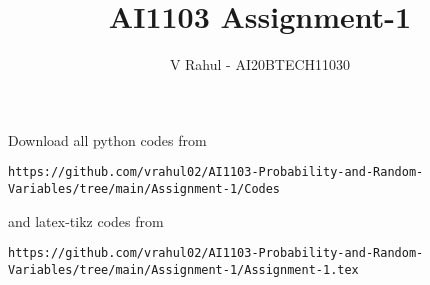 \documentclass[journal,12pt,twocolumn]{IEEEtran}
\DeclareMathOperator*{\Res}{Res}
\begin{document}
\newcommand{\BEQA}{\begin{eqnarray}}
\newcommand{\EEQA}{\end{eqnarray}}
\newcommand{\define}{\stackrel{\triangle}{=}}

\raggedbottom
\setlength{\parindent}{0pt}
\providecommand{\mbf}{\mathbf}
\providecommand{\pr}[1]{\ensuremath{\Pr\left(#1\right)}}
\providecommand{\qfunc}[1]{\ensuremath{Q\left(#1\right)}}
\providecommand{\sbrak}[1]{\ensuremath{{}\left[#1\right]}}
\providecommand{\lsbrak}[1]{\ensuremath{{}\left[#1\right.}}
\providecommand{\rsbrak}[1]{\ensuremath{{}\left.#1\right]}}
\providecommand{\brak}[1]{\ensuremath{\left(#1\right)}}
\providecommand{\lbrak}[1]{\ensuremath{\left(#1\right.}}
\providecommand{\rbrak}[1]{\ensuremath{\left.#1\right)}}
\providecommand{\cbrak}[1]{\ensuremath{\left\{#1\right\}}}
\providecommand{\lcbrak}[1]{\ensuremath{\left\{#1\right.}}
\providecommand{\rcbrak}[1]{\ensuremath{\left.#1\right\}}}
\theoremstyle{remark}
\newtheorem{rem}{Remark}
\newcommand{\sgn}{\mathop{\mathrm{sgn}}}
\providecommand{\abs}[1]{\vert#1\vert}
\providecommand{\res}[1]{\Res\displaylimits_{#1}} 
\providecommand{\norm}[1]{\lVert#1\rVert}
\providecommand{\mtx}[1]{\mathbf{#1}}
\providecommand{\mean}[1]{E[#1]}
\providecommand{\fourier}{\overset{\mathcal{F}}{ \rightleftharpoons}}
\providecommand{\system}{\overset{\mathcal{H}}{ \longleftrightarrow}}
\newcommand{\solution}{\noindent \textbf{Solution: }}
\newcommand{\cosec}{\,\text{cosec}\,}
\providecommand{\dec}[2]{\ensuremath{\overset{#1}{\underset{#2}{\gtrless}}}}
\newcommand{\myvec}[1]{\ensuremath{\begin{pmatrix}#1\end{pmatrix}}}
\newcommand{\mydet}[1]{\ensuremath{\begin{vmatrix}#1\end{vmatrix}}}
\makeatletter
{}
\makeatother
\let\StandardTheFigure\thefigure
\let\vec\mathbf
\renewcommand{\thefigure}{\theproblem}
\def\putbox#1#2#3{\makebox[0in][l]{\makebox[#1][l]{}\raisebox{\baselineskip}[0in][0in]{\raisebox{#2}[0in][0in]{#3}}}}
     \def\rightbox#1{\makebox[0in][r]{#1}}
     \def\centbox#1{\makebox[0in]{#1}}
     \def\topbox#1{\raisebox{-\baselineskip}[0in][0in]{#1}}
     \def\midbox#1{\raisebox{-0.5\baselineskip}[0in][0in]{#1}}
\vspace{3cm}
\title{AI1103 Assignment-1}
\author{V Rahul - AI20BTECH11030}
\maketitle
\newpage
\bigskip
\renewcommand{\thefigure}{\theenumi}
\renewcommand{\thetable}{\theenumi}
Download all python codes from 
\begin{lstlisting}
https://github.com/vrahul02/AI1103-Probability-and-Random-Variables/tree/main/Assignment-1/Codes
\end{lstlisting}
%
and latex-tikz codes from 
%
\begin{lstlisting}
https://github.com/vrahul02/AI1103-Probability-and-Random-Variables/tree/main/Assignment-1/Assignment-1.tex
\end{lstlisting}
\end{document}
